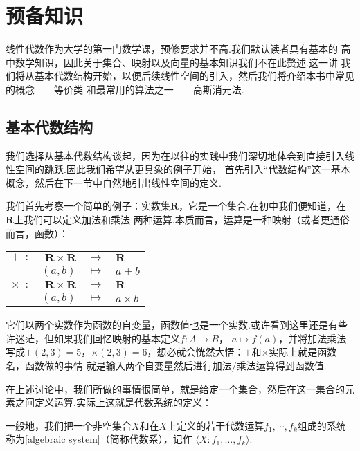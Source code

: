\chapter{预备知识}

\indent 线性代数作为大学的第一门数学课，预修要求并不高.我们默认读者具有基本的
高中数学知识，因此关于集合、映射以及向量的基本知识我们不在此赘述.这一讲
我们将从基本代数结构开始，以便后续线性空间的引入，然后我们将介绍本书中常见的概念——等价类
和最常用的算法之一——高斯消元法.

\section{基本代数结构}
我们选择从基本代数结构谈起，因为在以往的实践中我们深切地体会到直接引入线性空间的跳跃.因此我们希望从更具象的例子开始，
首先引入``代数结构''这一基本概念，然后在下一节中自然地引出线性空间的定义.

我们首先考察一个简单的例子：实数集$\mathbf{R}$，它是一个集合.在初中我们便知道，在$\mathbf{R}$上我们可以定义加法和乘法
两种运算.本质而言，运算是一种映射（或者更通俗而言，函数）：

\begin{center}
    \begin{tabular}{rrcl}
        $+\enspace\colon$ & $\mathbf{R}\times\mathbf{R}$&$\to$&$\mathbf{R}$\\
                   & $(a,b)$&$\mapsto$&$a+b$\\
        $\times\enspace\colon$ & $\mathbf{R}\times\mathbf{R}$&$\to$&$\mathbf{R}$\\
                        & $(a,b)$&$\mapsto$&$a\times b$
    \end{tabular}
\end{center}

它们以两个实数作为函数的自变量，函数值也是一个实数.或许看到这里还是有些许迷茫，但如果我们回忆映射的基本定义$f:A\to B$，
$a\mapsto f(a)$，并将加法乘法写成$+(2,3)=5$，$\times(2,3)=6$，想必就会恍然大悟：$+$和$\times$实际上就是函数名，函数做的事情
就是输入两个自变量然后进行加法/乘法运算得到函数值.

在上述讨论中，我们所做的事情很简单，就是给定一个集合，然后在这一集合的元素之间定义运算.实际上这就是代数系统的定义：
\begin{definition}
    一般地，我们把一个非空集合$X$和在$X$上定义的若干代数运算$f_1,\cdots,f_k$组成的系统称为[algebraic system]（简称代数系），记作
    $\langle X : f_1,\ldots,f_k\rangle$.
\end{definition}


